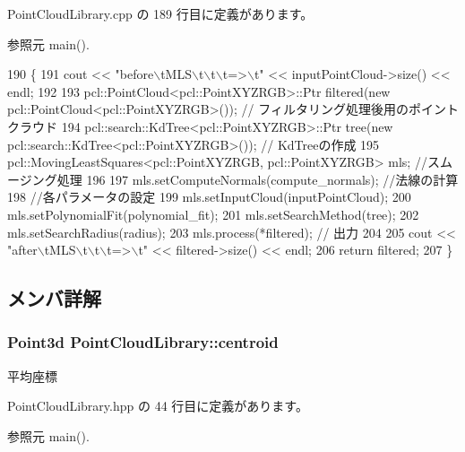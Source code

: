  Point\-Cloud\-Library.\-cpp の 189 行目に定義があります。



参照元 main().


\begin{DoxyCode}
190 \{
191     cout << \textcolor{stringliteral}{"before\(\backslash\)tMLS\(\backslash\)t\(\backslash\)t\(\backslash\)t=>\(\backslash\)t"} << inputPointCloud->size() << endl;
192 
193     pcl::PointCloud<pcl::PointXYZRGB>::Ptr filtered(\textcolor{keyword}{new} pcl::PointCloud<pcl::PointXYZRGB>()); \textcolor{comment}{//
      フィルタリング処理後用のポイントクラウド}
194     pcl::search::KdTree<pcl::PointXYZRGB>::Ptr tree(\textcolor{keyword}{new} pcl::search::KdTree<pcl::PointXYZRGB>()); \textcolor{comment}{//
      KdTreeの作成}
195     pcl::MovingLeastSquares<pcl::PointXYZRGB, pcl::PointXYZRGB> mls; \textcolor{comment}{//スムージング処理}
196 
197     mls.setComputeNormals(compute\_normals); \textcolor{comment}{//法線の計算}
198     \textcolor{comment}{//各パラメータの設定}
199     mls.setInputCloud(inputPointCloud);
200     mls.setPolynomialFit(polynomial\_fit);
201     mls.setSearchMethod(tree);
202     mls.setSearchRadius(radius);
203     mls.process(*filtered); \textcolor{comment}{// 出力}
204 
205     cout << \textcolor{stringliteral}{"after\(\backslash\)tMLS\(\backslash\)t\(\backslash\)t\(\backslash\)t=>\(\backslash\)t"} << filtered->size() << endl;
206     \textcolor{keywordflow}{return} filtered;
207 \}
\end{DoxyCode}


\subsection{メンバ詳解}
\subsubsection[{centroid}]{\setlength{\rightskip}{0pt plus 5cm}Point3d Point\-Cloud\-Library\-::centroid}\label{class_point_cloud_library_aa8b11edec4c6910b0a9ad5c5340dcfa2}


平均座標 



 Point\-Cloud\-Library.\-hpp の 44 行目に定義があります。



参照元 main().

